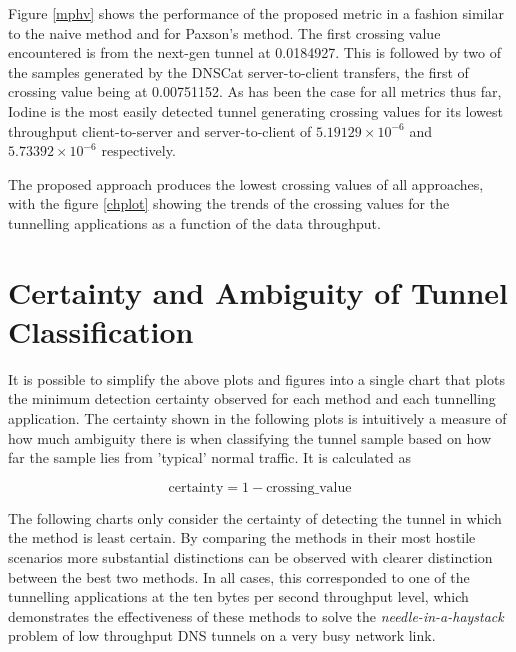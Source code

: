 \documentclass[12pt]{report}
\theoremstyle{remark}
\theoremstyle{definition}
\theoremstyle{definition}
\theoremstyle{definition}
\begin{document}
Figure \ref{mphv} shows the performance of the proposed metric in a fashion
similar to the naive method and for Paxson's method. The first crossing value
encountered is from the next-gen tunnel at 0.0184927. This is followed by two of
the samples generated by the DNSCat server-to-client transfers, the first of
crossing value being at 0.00751152. As has been the case for all metrics thus
far, Iodine is the most easily detected tunnel generating crossing values for
its lowest throughput client-to-server and server-to-client of
$5.19129\times10^{-6}$ and $5.73392\times10^{-6}$ respectively.

The proposed approach produces the lowest crossing values of all approaches,
with the figure \ref{chplot} showing the trends of the crossing values for the
tunnelling applications as a function of the data throughput.

\section{Certainty and Ambiguity of Tunnel Classification}
\label{detection-perf-cert}

It is possible to simplify the above plots and figures into a single chart that
plots the minimum detection certainty observed for each method and each
tunnelling application. The certainty shown in the following plots is
intuitively a measure of how much ambiguity there is when classifying the tunnel
sample based on how far the sample lies from 'typical' normal traffic. It is
calculated as

\[\textrm{certainty}=1-\textrm{crossing\_value}\]

The following charts only consider the certainty of detecting the tunnel in
which the method is least certain. By comparing the methods in their most
hostile scenarios more substantial distinctions can be observed with clearer
distinction between the best two methods. In all cases, this corresponded to one
of the tunnelling applications at the ten bytes per second throughput level,
which demonstrates the effectiveness of these methods to solve the
\emph{needle-in-a-haystack} problem of low throughput DNS tunnels on a very busy
network link.
\end{document}
